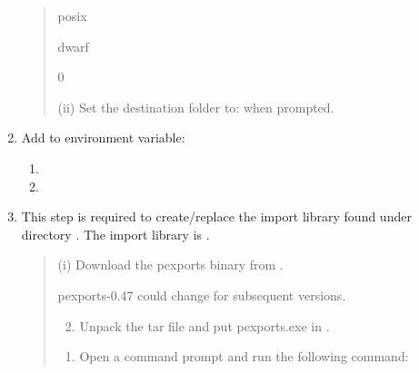 \documentclass[letterpaper,10pt,english]{sphinxmanual}
\begin{document}
\begin{enumerate}
\begin{quote}
 posix

 dwarf

 0

(ii) Set the destination folder to:  when
prompted.
\end{quote}

\item {} 
Add to environment variable:
\begin{enumerate}
\item {} 

\item {} 

\end{enumerate}

\item {} 
This step is required to create/replace the import library found
under directory . The import library is
.
\begin{quote}

(i) Download the pexports binary 
from
.

 pexports-0.47 could change for subsequent versions.
\begin{enumerate}
\setcounter{enumii}{1}
\item {} 
Unpack the tar file and put pexports.exe in .

\end{enumerate}
\begin{enumerate}
\item {} 
Open a command prompt and run the following command:

\end{enumerate}

%
\begin{sphinxVerbatim}[commandchars=\\\{\}]
 \PYGZbs{}\PYGZbs{}\PYGZbs{}  \PYGZbs{}
\end{sphinxVerbatim}


\end{quote}
\end{enumerate}
\end{document}
